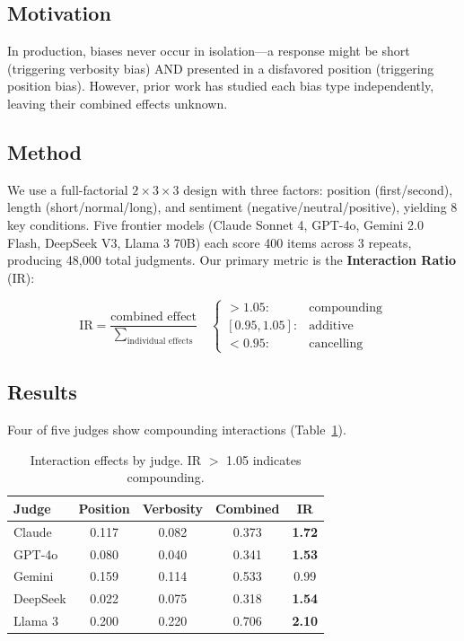\documentclass[11pt,twocolumn]{article}
\begin{document}
\subsection{Motivation}
In production, biases never occur in isolation---a response might be short (triggering verbosity bias) AND presented in a disfavored position (triggering position bias). However, prior work has studied each bias type independently, leaving their combined effects unknown.

\subsection{Method}
We use a full-factorial $2 \times 3 \times 3$ design with three factors: position (first/second), length (short/normal/long), and sentiment (negative/neutral/positive), yielding 8 key conditions. Five frontier models (Claude Sonnet 4, GPT-4o, Gemini 2.0 Flash, DeepSeek V3, Llama 3 70B) each score 400 items across 3 repeats, producing 48,000 total judgments. Our primary metric is the \textbf{Interaction Ratio} (IR):

\begin{equation}
\text{IR} = \frac{\text{combined effect}}{\sum_{\text{individual effects}}} \quad 
\begin{cases}
> 1.05: & \text{compounding} \\
[0.95, 1.05]: & \text{additive} \\
< 0.95: & \text{cancelling}
\end{cases}
\end{equation}

\subsection{Results}
Four of five judges show compounding interactions (Table~\ref{tab:study2}).

\begin{table}[h]
\centering\small
\caption{Interaction effects by judge. IR $>$ 1.05 indicates compounding.}
\label{tab:study2}
\begin{tabular}{lcccc}
\toprule
Judge & Position & Verbosity & Combined & IR \\
\midrule
Claude & 0.117 & 0.082 & 0.373 & \textbf{1.72} \\
GPT-4o & 0.080 & 0.040 & 0.341 & \textbf{1.53} \\
Gemini & 0.159 & 0.114 & 0.533 & 0.99 \\
DeepSeek & 0.022 & 0.075 & 0.318 & \textbf{1.54} \\
Llama 3 & 0.200 & 0.220 & 0.706 & \textbf{2.10} \\
\bottomrule
\end{tabular}
\end{table}
\end{document}
